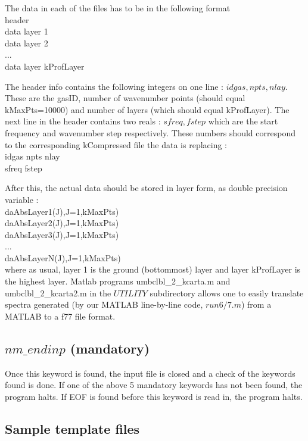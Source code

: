 \documentclass[12pt]{article}
\newcommand{\ttab}{\indent\indent}
\begin{document}
{{The data in each of the files has to be in the following format\\
\medskip
{\sf 
\ttab header\\
\ttab data layer 1\\
\ttab data layer 2\\
\ttab ...\\
\ttab data layer kProfLayer\\
\ttab }

The header info contains the following integers on one line : 
$idgas,npts,nlay$. These are the gasID, number of wavenumber points (should 
equal kMaxPts=10000) and number of layers (which should equal kProfLayer). 
The next line in the header contains two reals : $sfreq, fstep$ which are the 
start frequency and  wavenumber step respectively. These numbers should 
correspond to the corresponding kCompressed file the data is replacing :\\
\medskip
{\sf 
\ttab idgas npts nlay\\
\ttab sfreq fstep\\
\ttab }

After this, the actual data should be stored in layer form, as double 
precision variable : \\
\medskip
{\sf 
\ttab daAbsLayer1(J),J=1,kMaxPts)\\
\ttab daAbsLayer2(J),J=1,kMaxPts)\\
\ttab daAbsLayer3(J),J=1,kMaxPts)\\
\ttab ...\\
\ttab daAbsLayerN(J),J=1,kMaxPts)\\
\ttab }
where as usual, layer 1 is the ground (bottommost) layer and layer kProfLayer
is the highest layer. Matlab programs  umbclbl\_2\_kcarta.m and 
umbclbl\_2\_kcarta2.m in the $UTILITY$ subdirectory allows one to easily 
translate spectra generated (by our MATLAB
line-by-line code, $run6/7.m$) from a MATLAB to a f77 file format.

\subsection{$nm\_endinp$ (mandatory)}

Once this keyword is found, the input file is closed and a check of the 
keywords found is done.  If one of the above 5 mandatory keywords has not
been found, the program halts.  If EOF is found before this keyword is read 
in, the program halts.

\subsection{Sample template files}

}}
\end{document}
